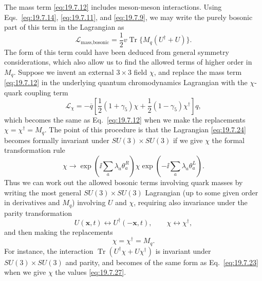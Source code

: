 The mass term \eqref{eq:19.7.12} includes meson-meson interactions. Using Eqs.~\eqref{eq:19.7.14}, \eqref{eq:19.7.11}, and \eqref{eq:19.7.9}, we may write the purely bosonic part of this term in the Lagrangian as
\begin{equation}
\mathcal L_{\text{mass,bosonic}}
=\frac12v\operatorname{Tr}\{M_q(U^\dagger+U)\}.
\tag{19.7.23}\label{eq:19.7.23}
\end{equation}
The form of this term could have been deduced from general symmetry considerations, which also allow us to find the allowed terms of higher order in $M_q$. Suppose we invent an external $3\times3$ field $\chi$, and replace the mass term \eqref{eq:19.7.12} in the underlying quantum chromodynamics Lagrangian with the $\chi$-quark coupling term
\begin{equation}
\mathcal L_\chi
=-\overline q\left[
\frac12(1+\gamma_5)\chi
+\frac12(1-\gamma_5)\chi^\dagger
\right]q,
\tag{19.7.24}\label{eq:19.7.24}
\end{equation}
which becomes the same as Eq.~\eqref{eq:19.7.12} when we make the replacements $\chi=\chi^\dagger=M_q$. The point of this procedure is that the Lagrangian \eqref{eq:19.7.24} becomes formally invariant under $SU(3)\times SU(3)$ if we give $\chi$ the formal transformation rule
\begin{equation}
\chi\longrightarrow
\exp\left(\ii\sum_a\lambda_a\theta_a^R\right)
\chi
\exp\left(-\ii\sum_a\lambda_a\theta_a^L\right).
\tag{19.7.25}\label{eq:19.7.25}
\end{equation}
Thus we can work out the allowed bosonic terms involving quark masses by writing the most general $SU(3)\times SU(3)$ Lagrangian (up to some given order in derivatives and $M_q$) involving $U$ and $\chi$, requiring also invariance under the parity transformation
\begin{equation}
U(\boldsymbol x,t)\longleftrightarrow U^\dagger(-\boldsymbol x,t),
\qquad
\chi\longleftrightarrow\chi^\dagger,
\tag{19.7.26}\label{eq:19.7.26}
\end{equation}
and then making the replacements
\begin{equation}
\chi=\chi^\dagger=M_q.
\tag{19.7.27}\label{eq:19.7.27}
\end{equation}
For instance, the interaction $\operatorname{Tr}(U^\dagger\chi+U\chi^\dagger)$ is invariant under $SU(3)\times SU(3)$ and parity, and becomes of the same form as Eq.~\eqref{eq:19.7.23} when we give $\chi$ the values \eqref{eq:19.7.27}.

